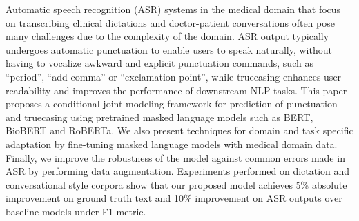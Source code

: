 Automatic speech recognition (ASR) systems in the medical domain that focus on transcribing clinical dictations and doctor-patient conversations often pose many challenges due to the complexity of the domain. ASR output typically undergoes automatic punctuation to enable users to speak naturally, without having to vocalize awkward and explicit punctuation commands, such  as ``period'', ``add  comma'' or ``exclamation point'', while truecasing enhances user readability and improves the performance of downstream NLP tasks. This paper proposes a conditional joint modeling framework for prediction of punctuation and truecasing using pretrained masked language models such as BERT, BioBERT and RoBERTa. We also present techniques for domain and task specific adaptation by fine-tuning masked language models with medical domain data.  Finally, we improve the robustness of the model against common errors made in ASR by performing data augmentation. Experiments performed on dictation and conversational style corpora show that our proposed model achieves 5\% absolute improvement on ground truth text and 10\% improvement on ASR outputs over baseline models under F1 metric.
